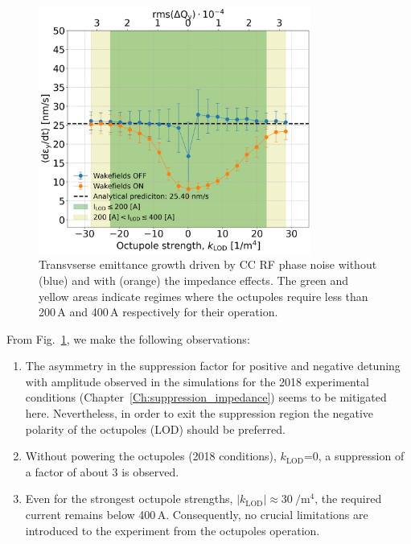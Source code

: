 \begin{figure}[!h] %
   \centering         
   \includegraphics[width=0.8\textwidth]{images/Ch8/deyRates_sps_270GeV_PN1e-8_400MHz_SPS_NewWakesAllcontributions_appendWakes_y-plane_WakesONvsOFF_QpxQpy1_6D_Nb5e5_intensity3e10Scan_vs_TuneSpreadvsExpectedSPS_octupole_current.png}
       \caption{Transvserse emittance growth driven by CC RF phase noise without (blue) and with (orange) the impedance effects. The green and yellow areas indicate regimes where the octupoles require less than 200\,A and 400\,A respectively for their operation.}
       \label{fig:pyheadtail_cc_impedance_2022_md_octupole_current}
\end{figure}

From Fig.~\ref{fig:pyheadtail_cc_impedance_2022_md_octupole_current}, we make the following observations:
\begin{enumerate}
   \item The asymmetry in the suppression factor for positive and negative detuning with amplitude observed in the simulations for the 2018 experimental conditions (Chapter~\ref{Ch:suppression_impedance}) seems to be mitigated here. Nevertheless, in order to exit the suppression region the negative polarity of the octupoles (LOD) should be preferred.
   \item Without powering the octupoles (2018 conditions), $k_\mathrm{LOD}$=0, a suppression of a factor of about 3 is observed.
   \item Even for the strongest octupole strengths, $| k_\mathrm{LOD} |\approx 30 \ \mathrm{/m^4}$, the required current remains below 400\,A. Consequently, no crucial limitations are introduced to the experiment from the octupoles operation.
\end{enumerate}

